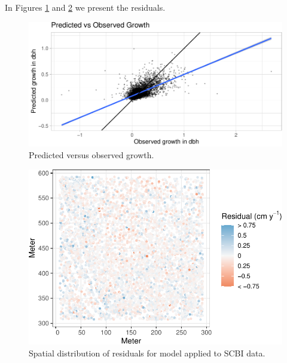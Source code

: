 \documentclass[12pt]{article}
\newenvironment{Shaded}{\begin{snugshade}}{\end{snugshade}}
\newcommand{\CommentTok}[1]{\textcolor[rgb]{0.56,0.35,0.01}{\textit{#1}}}
\newcommand{\DataTypeTok}[1]{\textcolor[rgb]{0.13,0.29,0.53}{#1}}
\newcommand{\KeywordTok}[1]{\textcolor[rgb]{0.13,0.29,0.53}{\textbf{#1}}}
\newcommand{\NormalTok}[1]{#1}
\newcommand{\OperatorTok}[1]{\textcolor[rgb]{0.81,0.36,0.00}{\textbf{#1}}}
\newcommand{\StringTok}[1]{\textcolor[rgb]{0.31,0.60,0.02}{#1}}
\begin{document}
\begin{Shaded}
\end{Shaded}

In Figures \ref{fig:scbi-model-residuals} and
\ref{fig:scbi-model-residuals-2} we present the residuals.

\begin{figure}

{\centering \includegraphics[width=1\linewidth]{Figures/scbi-model-residuals-1} 

}

\caption{Predicted versus observed growth.}\label{fig:scbi-model-residuals}
\end{figure}

\begin{figure}

{\centering \includegraphics[width=0.8\linewidth]{Figures/scbi-model-residuals-2-1} 

}

\caption{Spatial distribution of residuals for model applied to SCBI data.}\label{fig:scbi-model-residuals-2}
\end{figure}
\end{document}
